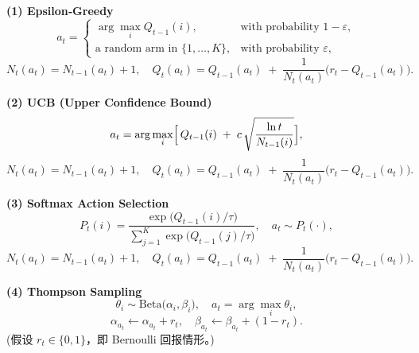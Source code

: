 \documentclass{article}
\begin{document}

\bigskip
\noindent\textbf{(1) Epsilon‐Greedy}
\[
a_t =
\begin{cases}
\displaystyle \arg\max_{i} Q_{t-1}(i), & \text{with probability }1-\varepsilon,\\[6pt]
\text{a random arm in }\{1,\dots,K\}, & \text{with probability }\varepsilon,
\end{cases}
\]
\[
N_t(a_t)=N_{t-1}(a_t)+1,\quad
Q_t(a_t) = Q_{t-1}(a_t)\;+\;\frac{1}{N_t(a_t)}\bigl(r_t - Q_{t-1}(a_t)\bigr).
\]

\bigskip
\noindent\textbf{(2) UCB (Upper Confidence Bound)}
\[
a_t = \arg\max_{i}\Bigl[\,Q_{t-1}(i)\;+\;c\,\sqrt{\frac{\ln t}{N_{t-1}(i)}}\Bigr],
\]
\[
N_t(a_t)=N_{t-1}(a_t)+1,\quad
Q_t(a_t) = Q_{t-1}(a_t)\;+\;\frac{1}{N_t(a_t)}\bigl(r_t - Q_{t-1}(a_t)\bigr).
\]

\bigskip
\noindent\textbf{(3) Softmax Action Selection}
\[
P_t(i) = \frac{\exp\bigl(Q_{t-1}(i)/\tau\bigr)}
{\sum_{j=1}^K \exp\bigl(Q_{t-1}(j)/\tau\bigr)}, 
\quad a_t\sim P_t(\cdot),
\]
\[
N_t(a_t)=N_{t-1}(a_t)+1,\quad
Q_t(a_t) = Q_{t-1}(a_t)\;+\;\frac{1}{N_t(a_t)}\bigl(r_t - Q_{t-1}(a_t)\bigr).
\]

\bigskip
\noindent\textbf{(4) Thompson Sampling}
\[
\theta_i \sim \mathrm{Beta}\bigl(\alpha_{i},\beta_{i}\bigr),\quad
a_t = \arg\max_{i}\theta_i,
\]
\[
\alpha_{a_t} \leftarrow \alpha_{a_t} + r_t,\quad
\beta_{a_t} \leftarrow \beta_{a_t} + (1 - r_t).
\]
(假设 \(r_t\in\{0,1\}\)，即 Bernoulli 回报情形。)
\end{document}
